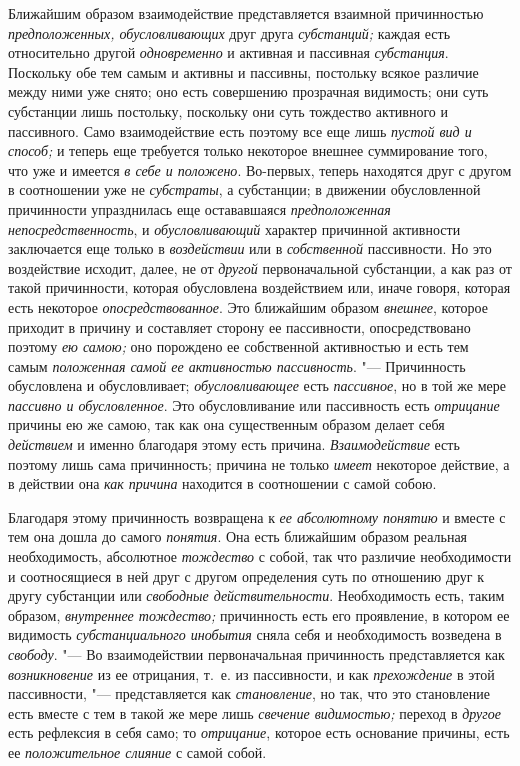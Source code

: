Ближайшим образом взаимодействие представляется взаимной причинностью
{\em предположенных, обусловливающих} друг друга
{\em субстанций;} каждая есть относительно другой
{\em одновременно} и активная и пассивная
{\em субстанция}. Поскольку обе тем самым и активны и
пассивны, постольку всякое различие между ними уже снято; оно есть
совершению прозрачная видимость; они суть субстанции лишь постольку,
поскольку они суть тождество активного и пассивного. Само взаимодействие
есть поэтому все еще лишь {\em пустой вид и способ;} и
теперь еще требуется только некоторое внешнее суммирование того, что уже и
имеется {\em в себе и положено}. Во-первых, теперь
находятся друг с другом в соотношении уже не
{\em субстраты}, а субстанции; в движении обусловленной
причинности упразднилась еще остававшаяся
{\em предположенная непосредственность}, и
{\em обусловливающий} характер причинной активности
заключается еще только в {\em воздействии} или в
{\em собственной} пассивности. Но это воздействие
исходит, далее, не от {\em другой} первоначальной
субстанции, а как раз от такой причинности, которая обусловлена
воздействием или, иначе говоря, которая есть некоторое
{\em опосредствованное}. Это ближайшим образом
{\em внешнее}, которое приходит в причину и составляет
сторону ее пассивности, опосредствовано поэтому {\em ею
самою;} оно порождено ее собственной активностью и есть тем самым
{\em положенная самой ее активностью пассивность}. "---
Причинность обусловлена и обусловливает; {\em обусловливающее} есть
{\em пассивное}, но в той же мере
{\em пассивно и обусловленное}. Это обусловливание или
пассивность есть {\em отрицание} причины ею же самою,
так как она существенным образом делает себя
{\em действием} и именно благодаря этому есть причина.
{\em Взаимодействие} есть поэтому лишь сама
причинность; причина не только {\em имеет} некоторое
действие, а в действии она {\em как причина} находится
в соотношении с самой собою.

Благодаря этому причинность возвращена к {\em ее
абсолютному понятию} и вместе с тем она дошла до самого
{\em понятия}. Она есть ближайшим образом реальная
необходимость, абсолютное {\em тождество} с собой, так
что различие необходимости и соотносящиеся в ней друг с другом определения
суть по отношению друг к другу субстанции или
{\em свободные действительности}. Необходимость есть,
таким образом, {\em внутреннее тождество;} причинность
есть его проявление, в котором ее видимость
{\em субстанциального инобытия} сняла себя и
необходимость возведена в {\em свободу}. "--- Во
взаимодействии первоначальная причинность представляется как
{\em возникновение} из ее отрицания, т.~е. из
пассивности, и как {\em прехождение} в этой
пассивности, "--- представляется как {\em становление}, но
так, что это становление есть вместе с тем в такой же мере лишь
{\em свечение видимостью;} переход в
{\em другое} есть рефлексия в себя само; то
{\em отрицание}, которое есть основание причины, есть
ее {\em положительное слияние} с самой собой.

